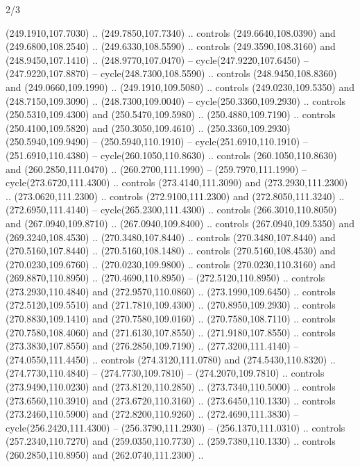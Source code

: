 \begin{flagdescription}{2/3}
\begin{scope}[xshift=0.5\flaglength,yshift=0.5\flagwidth,scale=\flagwidth/259.2]
\begin{scope}[y=0.8pt, x=0.8pt, yscale=-1,shift={(-243,-162)}]
      (249.1910,107.7030) .. (249.7850,107.7340) .. controls (249.6640,108.0390) and
      (249.6800,108.2540) .. (249.6330,108.5590) .. controls (249.3590,108.3160) and
      (248.9450,107.1410) .. (248.9770,107.0470) -- cycle(247.9220,107.6450) --
      (247.9220,107.8870) -- cycle(248.7300,108.5590) .. controls
      (248.9450,108.8360) and (249.0660,109.1990) .. (249.1910,109.5080) .. controls
      (249.0230,109.5350) and (248.7150,109.3090) .. (248.7300,109.0040) --
      cycle(250.3360,109.2930) .. controls (250.5310,109.4300) and
      (250.5470,109.5980) .. (250.4880,109.7190) .. controls (250.4100,109.5820) and
      (250.3050,109.4610) .. (250.3360,109.2930)(250.5940,109.9490) --
      (250.5940,110.1910) -- cycle(251.6910,110.1910) -- (251.6910,110.4380) --
      cycle(260.1050,110.8630) .. controls (260.1050,110.8630) and
      (260.2850,111.0470) .. (260.2700,111.1990) -- (259.7970,111.1990) --
      cycle(273.6720,111.4300) .. controls (273.4140,111.3090) and
      (273.2930,111.2300) .. (273.0620,111.2300) .. controls (272.9100,111.2300) and
      (272.8050,111.3240) .. (272.6950,111.4140) -- cycle(265.2300,111.4300) ..
      controls (266.3010,110.8050) and (267.0940,109.8710) .. (267.0940,109.8400) ..
      controls (267.0940,109.5350) and (269.3240,108.4530) .. (270.3480,107.8440) ..
      controls (270.3480,107.8440) and (270.5160,107.8440) .. (270.5160,108.1480) ..
      controls (270.5160,108.4530) and (270.0230,109.6760) .. (270.0230,109.9800) ..
      controls (270.0230,110.3160) and (269.8870,110.8950) .. (270.4690,110.8950) --
      (272.5120,110.8950) .. controls (273.2930,110.4840) and (272.9570,110.0860) ..
      (273.1990,109.6450) .. controls (272.5120,109.5510) and (271.7810,109.4300) ..
      (270.8950,109.2930) .. controls (270.8830,109.1410) and (270.7580,109.0160) ..
      (270.7580,108.7110) .. controls (270.7580,108.4060) and (271.6130,107.8550) ..
      (271.9180,107.8550) .. controls (273.3830,107.8550) and (276.2850,109.7190) ..
      (277.3200,111.4140) -- (274.0550,111.4450) .. controls (274.3120,111.0780) and
      (274.5430,110.8320) .. (274.7730,110.4840) -- (274.7730,109.7810) --
      (274.2070,109.7810) .. controls (273.9490,110.0230) and (273.8120,110.2850) ..
      (273.7340,110.5000) .. controls (273.6560,110.3910) and (273.6720,110.3160) ..
      (273.6450,110.1330) .. controls (273.2460,110.5900) and (272.8200,110.9260) ..
      (272.4690,111.3830) -- cycle(256.2420,111.4300) -- (256.3790,111.2930) --
      (256.1370,111.0310) .. controls (257.2340,110.7270) and (259.0350,110.7730) ..
      (259.7380,110.1330) .. controls (260.2850,110.8950) and (262.0740,111.2300) ..

\end{scope}
\end{scope}
\end{flagdescription}
